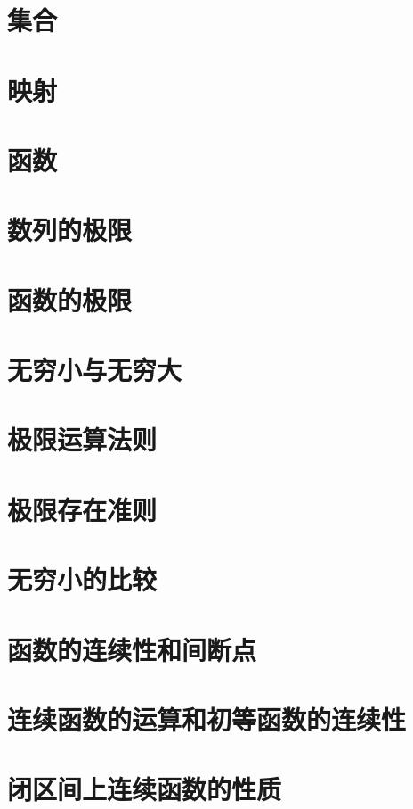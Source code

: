 \documentclass{article}
\begin{document}
  \tableofcontents
  \newpage

  \section{集合}
    
  \section{映射}
    
  \section{函数}
    
  \section{数列的极限}
    
  \section{函数的极限}
    
  \section{无穷小与无穷大}
    
  \section{极限运算法则}
    
  \section{极限存在准则}
    
  \section{无穷小的比较}
    
  \section{函数的连续性和间断点}
    
  \section{连续函数的运算和初等函数的连续性}
    
  \section{闭区间上连续函数的性质}
    
\end{document}

